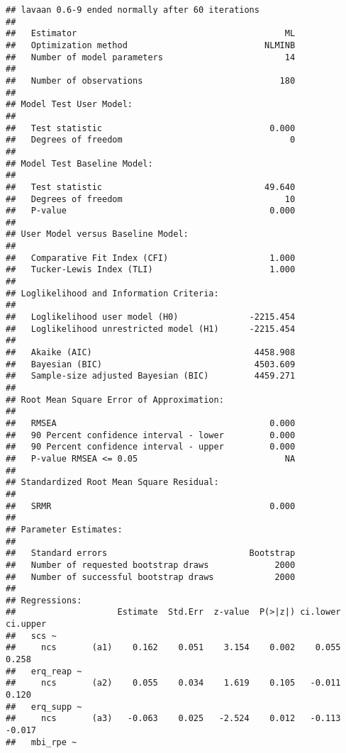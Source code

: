 \documentclass[
  english,
  man]{apa6}
\begin{document}
\begin{verbatim}
## lavaan 0.6-9 ended normally after 60 iterations
## 
##   Estimator                                         ML
##   Optimization method                           NLMINB
##   Number of model parameters                        14
##                                                       
##   Number of observations                           180
##                                                       
## Model Test User Model:
##                                                       
##   Test statistic                                 0.000
##   Degrees of freedom                                 0
## 
## Model Test Baseline Model:
## 
##   Test statistic                                49.640
##   Degrees of freedom                                10
##   P-value                                        0.000
## 
## User Model versus Baseline Model:
## 
##   Comparative Fit Index (CFI)                    1.000
##   Tucker-Lewis Index (TLI)                       1.000
## 
## Loglikelihood and Information Criteria:
## 
##   Loglikelihood user model (H0)              -2215.454
##   Loglikelihood unrestricted model (H1)      -2215.454
##                                                       
##   Akaike (AIC)                                4458.908
##   Bayesian (BIC)                              4503.609
##   Sample-size adjusted Bayesian (BIC)         4459.271
## 
## Root Mean Square Error of Approximation:
## 
##   RMSEA                                          0.000
##   90 Percent confidence interval - lower         0.000
##   90 Percent confidence interval - upper         0.000
##   P-value RMSEA <= 0.05                             NA
## 
## Standardized Root Mean Square Residual:
## 
##   SRMR                                           0.000
## 
## Parameter Estimates:
## 
##   Standard errors                            Bootstrap
##   Number of requested bootstrap draws             2000
##   Number of successful bootstrap draws            2000
## 
## Regressions:
##                    Estimate  Std.Err  z-value  P(>|z|) ci.lower ci.upper
##   scs ~                                                                 
##     ncs       (a1)    0.162    0.051    3.154    0.002    0.055    0.258
##   erq_reap ~                                                            
##     ncs       (a2)    0.055    0.034    1.619    0.105   -0.011    0.120
##   erq_supp ~                                                            
##     ncs       (a3)   -0.063    0.025   -2.524    0.012   -0.113   -0.017
##   mbi_rpe ~                                                             

\end{verbatim}
\end{document}

